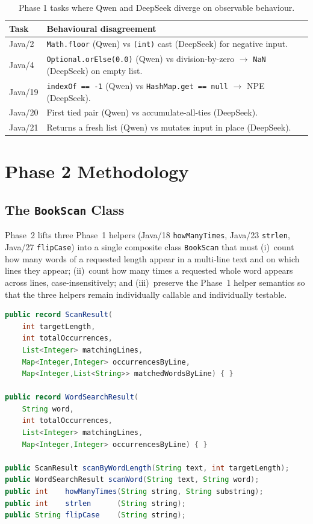 \documentclass[journal]{IEEEtran}
\begin{document}
\begin{table}[!t]
\renewcommand{\arraystretch}{1.15}
\caption{Phase 1 tasks where Qwen and DeepSeek diverge on observable behaviour.}
\label{tab:divergence}
\centering
\footnotesize
\begin{tabular}{@{}lp{6.0cm}@{}}
\toprule
\textbf{Task} & \textbf{Behavioural disagreement} \\
\midrule
Java/2  & \texttt{Math.floor} (Qwen) vs \texttt{(int)} cast (DeepSeek) for negative input. \\
Java/4  & \texttt{Optional.orElse(0.0)} (Qwen) vs division-by-zero \(\to\) \texttt{NaN} (DeepSeek) on empty list. \\
Java/19 & \texttt{indexOf == -1} (Qwen) vs \texttt{HashMap.get == null} \(\to\) NPE (DeepSeek). \\
Java/20 & First tied pair (Qwen) vs accumulate-all-ties (DeepSeek). \\
Java/21 & Returns a fresh list (Qwen) vs mutates input in place (DeepSeek). \\
\bottomrule
\end{tabular}
\end{table}

\section{Phase 2 Methodology}\label{sec:phase2-method}

\subsection{The \texttt{BookScan} Class}

Phase~2 lifts three Phase~1 helpers (Java/18 \texttt{howManyTimes}, Java/23
\texttt{strlen}, Java/27 \texttt{flipCase}) into a single composite class
\texttt{BookScan} that must (i)~count how many words of a requested length
appear in a multi-line text and on which lines they appear; (ii)~count how
many times a requested whole word appears across lines, case-insensitively;
and (iii)~preserve the Phase~1 helper semantics so that the three helpers
remain individually callable and individually testable.

\begin{lstlisting}[language=Java, caption=Public surface of the final BookScan class.]
public record ScanResult(
    int targetLength,
    int totalOccurrences,
    List<Integer> matchingLines,
    Map<Integer,Integer> occurrencesByLine,
    Map<Integer,List<String>> matchedWordsByLine) { }

public record WordSearchResult(
    String word,
    int totalOccurrences,
    List<Integer> matchingLines,
    Map<Integer,Integer> occurrencesByLine) { }

public ScanResult scanByWordLength(String text, int targetLength);
public WordSearchResult scanWord(String text, String word);
public int    howManyTimes(String string, String substring);
public int    strlen      (String string);
public String flipCase    (String string);
\end{lstlisting}
\end{document}
